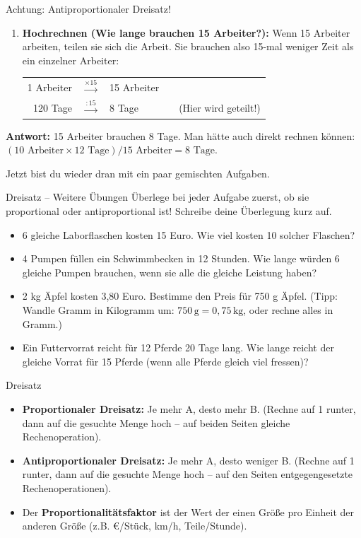 \begin{infoboxumgebung}{Achtung: Antiproportionaler Dreisatz!}
\begin{enumerate}
    \item \textbf{Hochrechnen (Wie lange brauchen 15 Arbeiter?):}
    Wenn 15 Arbeiter arbeiten, teilen sie sich die Arbeit. Sie brauchen also 15-mal weniger Zeit als ein einzelner Arbeiter:
    \begin{tabular}{rclcl}
        1 Arbeiter & $\xrightarrow{\times 15}$ & 15 Arbeiter & & \\
        120 Tage & $\xrightarrow{: 15}$ & 8 Tage & & \small{(Hier wird geteilt!)} \\
    \end{tabular}
\end{enumerate}
\textbf{Antwort:} 15 Arbeiter brauchen 8 Tage.
Man hätte auch direkt rechnen können: $(10 \text{ Arbeiter} \times 12 \text{ Tage}) / 15 \text{ Arbeiter} = 8 \text{ Tage}$.
\end{infoboxumgebung}

Jetzt bist du wieder dran mit ein paar gemischten Aufgaben.

\begin{aufgabenumgebung}{Dreisatz – Weitere Übungen}
Überlege bei jeder Aufgabe zuerst, ob sie proportional oder antiproportional ist! Schreibe deine Überlegung kurz auf.
\begin{itemize}
    \item 6 gleiche Laborflaschen kosten 15 Euro. Wie viel kosten 10 solcher Flaschen?
    \item 4 Pumpen füllen ein Schwimmbecken in 12 Stunden. Wie lange würden 6 gleiche Pumpen brauchen, wenn sie alle die gleiche Leistung haben?
    \item 2 kg Äpfel kosten 3,80 Euro. Bestimme den Preis für 750 g Äpfel. (Tipp: Wandle Gramm in Kilogramm um: $750\,\text{g} = 0,75\,\text{kg}$, oder rechne alles in Gramm.)
    \item Ein Futtervorrat reicht für 12 Pferde 20 Tage lang. Wie lange reicht der gleiche Vorrat für 15 Pferde (wenn alle Pferde gleich viel fressen)?
\end{itemize}
\end{aufgabenumgebung}

\begin{kurzknappumgebung}{Dreisatz}
\begin{itemize}
    \item \textbf{Proportionaler Dreisatz:} Je mehr A, desto mehr B. (Rechne auf 1 runter, dann auf die gesuchte Menge hoch – auf beiden Seiten gleiche Rechenoperation).
    \item \textbf{Antiproportionaler Dreisatz:} Je mehr A, desto weniger B. (Rechne auf 1 runter, dann auf die gesuchte Menge hoch – auf den Seiten entgegengesetzte Rechenoperationen).
    \item Der \textbf{Proportionalitätsfaktor} ist der Wert der einen Größe pro Einheit der anderen Größe (z.B. €/Stück, km/h, Teile/Stunde).
\end{itemize}
\end{kurzknappumgebung}

